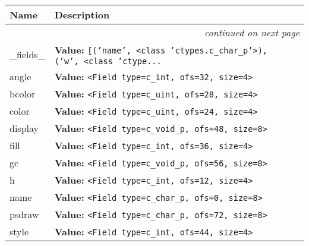     \vspace{-1cm}
\hspace{\varindent}\begin{longtable}{|p{\varnamewidth}|p{\vardescrwidth}|l}
\cline{1-2}
\cline{1-2} \centering \textbf{Name} & \centering \textbf{Description}& \\
\cline{1-2}
\endhead\cline{1-2}\multicolumn{3}{r}{\small\textit{continued on next page}}\\\endfoot\cline{1-2}
\endlastfoot\raggedright \_\-f\-i\-e\-l\-d\-s\-\_\- & \raggedright \textbf{Value:} 
{\tt \texttt{[}\texttt{(}\texttt{'}\texttt{name}\texttt{'}\texttt{, }{\textless}class 'ctypes.c\_char\_p'{\textgreater}\texttt{)}\texttt{, }\texttt{(}\texttt{'}\texttt{w}\texttt{'}\texttt{, }{\textless}class 'ctype\texttt{...}}&\\
\cline{1-2}
\raggedright a\-n\-g\-l\-e\- & \raggedright \textbf{Value:} 
{\tt {\textless}Field type=c\_int, ofs=32, size=4{\textgreater}}&\\
\cline{1-2}
\raggedright b\-c\-o\-l\-o\-r\- & \raggedright \textbf{Value:} 
{\tt {\textless}Field type=c\_uint, ofs=28, size=4{\textgreater}}&\\
\cline{1-2}
\raggedright c\-o\-l\-o\-r\- & \raggedright \textbf{Value:} 
{\tt {\textless}Field type=c\_uint, ofs=24, size=4{\textgreater}}&\\
\cline{1-2}
\raggedright d\-i\-s\-p\-l\-a\-y\- & \raggedright \textbf{Value:} 
{\tt {\textless}Field type=c\_void\_p, ofs=48, size=8{\textgreater}}&\\
\cline{1-2}
\raggedright f\-i\-l\-l\- & \raggedright \textbf{Value:} 
{\tt {\textless}Field type=c\_int, ofs=36, size=4{\textgreater}}&\\
\cline{1-2}
\raggedright g\-c\- & \raggedright \textbf{Value:} 
{\tt {\textless}Field type=c\_void\_p, ofs=56, size=8{\textgreater}}&\\
\cline{1-2}
\raggedright h\- & \raggedright \textbf{Value:} 
{\tt {\textless}Field type=c\_int, ofs=12, size=4{\textgreater}}&\\
\cline{1-2}
\raggedright n\-a\-m\-e\- & \raggedright \textbf{Value:} 
{\tt {\textless}Field type=c\_char\_p, ofs=0, size=8{\textgreater}}&\\
\cline{1-2}
\raggedright p\-s\-d\-r\-a\-w\- & \raggedright \textbf{Value:} 
{\tt {\textless}Field type=c\_char\_p, ofs=72, size=8{\textgreater}}&\\
\cline{1-2}
\raggedright s\-t\-y\-l\-e\- & \raggedright \textbf{Value:} 
{\tt {\textless}Field type=c\_int, ofs=44, size=4{\textgreater}}&\\

\end{longtable}
